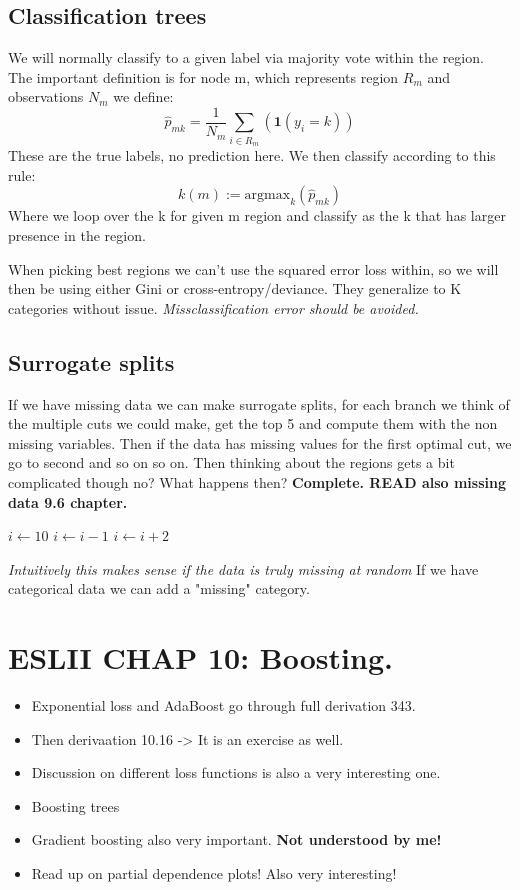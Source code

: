 \documentclass{article}
\begin{document}
\subsection*{Classification trees}
We will normally classify to a given label via majority vote within the region.
The important definition is for node m, which represents region $R_m$ and observations $N_m$ we define: 
$$\hat{p}_{mk} = \frac{1}{N_m}\sum_{i \in R_m}(\textbf{1}(y_i = k))$$
These are the true labels, no prediction here.
We then classify according to this rule: $$k(m) := \textrm{argmax}_{k} (\hat{p}_{mk})$$
Where we loop over the k for given m region and classify as the k that has larger presence in the region.


When picking best regions we can't use the squared error loss within, so we will then be using either Gini or cross-entropy/deviance. They generalize to K categories without issue. \textit{ Missclassification error should be avoided.}  

\subsection*{Surrogate splits}
If we have missing data we can make surrogate splits, for each branch we think of the multiple cuts we could make, get the top 5 and compute them with the non missing variables.
Then if the data has missing values for the first optimal cut, we go to second and so on so on. Then thinking about the regions gets a bit complicated though no? 
What happens then? \textbf{Complete. READ also missing data 9.6 chapter.}

\begin{algorithmic}
\State $i \gets 10$
    \State $i \gets i-1$
\Else
        \State $i \gets i+2$
    \EndIf
\EndIf 
\end{algorithmic}


\textit{Intuitively this makes sense if the data is truly missing at random}
If we have categorical data we can add a "missing" category.

\section*{ESLII CHAP 10: Boosting.}
\begin{itemize}
    \item Exponential loss and AdaBoost go through full derivation 343.
    \item Then derivaation 10.16 -> It is an exercise as well.
    \item Discussion on different loss functions is also a very interesting one.
    \item Boosting trees 
    \item Gradient boosting also very important. \textbf{Not understood by me!}
    \item Read up on partial dependence plots! Also very interesting!
\end{itemize}
\end{document}
